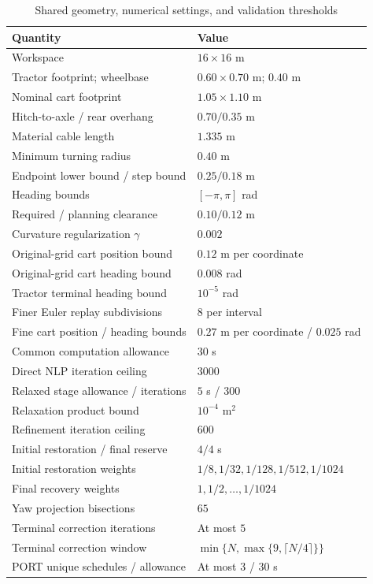 \begin{table}[!t]
\centering\caption{Shared geometry, numerical settings, and validation thresholds}
\label{tab:settings}\footnotesize
\setlength{\tabcolsep}{4pt}
\begin{tabular}{ll}
\toprule
Quantity & Value\\
\midrule
Workspace & $16\times16$ m\\
Tractor footprint; wheelbase & $0.60\times0.70$ m; $0.40$ m\\
Nominal cart footprint & $1.05\times1.10$ m\\
Hitch-to-axle / rear overhang & $0.70/0.35$ m\\
Material cable length & $1.335$ m\\
Minimum turning radius & $0.40$ m\\
Endpoint lower bound / step bound & $0.25/0.18$ m\\
Heading bounds & $[-\pi,\pi]$ rad\\
Required / planning clearance & $0.10/0.12$ m\\
Curvature regularization $\gamma$ & $0.002$\\
Original-grid cart position bound & $0.12$ m per coordinate\\
Original-grid cart heading bound & $0.008$ rad\\
Tractor terminal heading bound & $10^{-5}$ rad\\
Finer Euler replay subdivisions & $8$ per interval\\
Fine cart position / heading bounds & $0.27$ m per coordinate / $0.025$ rad\\
Common computation allowance & $30$ s\\
Direct NLP iteration ceiling & $3000$\\
Relaxed stage allowance / iterations & $5$ s / $300$\\
Relaxation product bound & $10^{-4}$ m$^2$\\
Refinement iteration ceiling & $600$\\
Initial restoration / final reserve & $4/4$ s\\
Initial restoration weights & $1/8,1/32,1/128,1/512,1/1024$\\
Final recovery weights & $1,1/2,\ldots,1/1024$\\
Yaw projection bisections & $65$\\
Terminal correction iterations & At most $5$\\
Terminal correction window & $\min\{N,\max\{9,\lceil N/4\rceil\}\}$\\
PORT unique schedules / allowance & At most $3$ / $30$ s\\
\bottomrule
\end{tabular}
\end{table}

